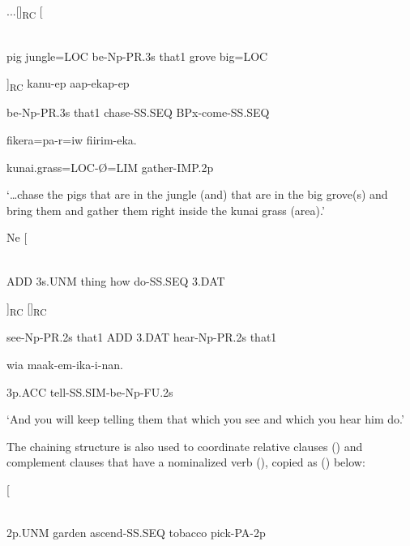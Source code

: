 \ea%
\label{ex:x1381}
\gll ...[]\textsubscript{RC}\textstyleEmphasizedVernacularWords{, } [ \\
      \\
\glt
\z

pig  jungle=LOC  be-Np-PR.3s  that1  grove  big=LOC

  ]\textsubscript{RC}  kanu-ep  aap-ekap-ep

be-Np-PR.3s  that1  chase-SS.SEQ  BPx-come-SS.SEQ

fikera=pa-r=iw  fiirim-eka.

kunai.grass=LOC-{\O}=LIM  gather-IMP.2p

`{\dots}chase the pigs that are in the jungle (and) that are in the big grove(s) and bring them and gather them right inside the kunai grass (area).'

\ea%
\label{ex:x1382}
\gll Ne   [ \\
      \\
\glt
\z

ADD  3s.UNM  thing  how  do-SS.SEQ  3.DAT  

  ]\textsubscript{RC}   []\textsubscript{RC}

see-Np-PR.2s  that1  ADD  3.DAT  hear-Np-PR.2s  that1  

wia  maak-em-ika-i-nan.

3p.ACC  tell-SS.SIM-be-Np-FU.2s

`And you will keep telling them that which you see and which you hear him do.'

The chaining structure is also used to coordinate relative clauses () and complement clauses that have a nominalized verb (), copied as () below: 

\ea%
\label{ex:x1463}
\gll [  \\
      \\
\glt
\z

2p.UNM  garden  ascend-SS.SEQ  tobacco  pick-PA-2p  


